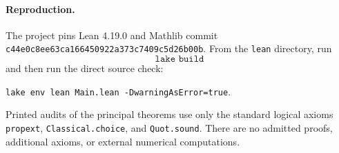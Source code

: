 \documentclass[11pt]{article}
\begin{document}
\paragraph{Reproduction.}
The project pins Lean 4.19.0 and Mathlib commit
\texttt{c44e0c8ee63ca166450922a373c7409c5d26b00b}.
From the \texttt{lean} directory, run
\[
 \texttt{lake build}
\]
and then run the direct source check:
\begin{center}
\small\texttt{lake env lean Main.lean -DwarningAsError=true}.
\end{center}
Printed audits of the principal theorems use only the standard logical axioms \texttt{propext}, \texttt{Classical.choice}, and \texttt{Quot.sound}.
There are no admitted proofs, additional axioms, or external numerical computations.
\end{document}
